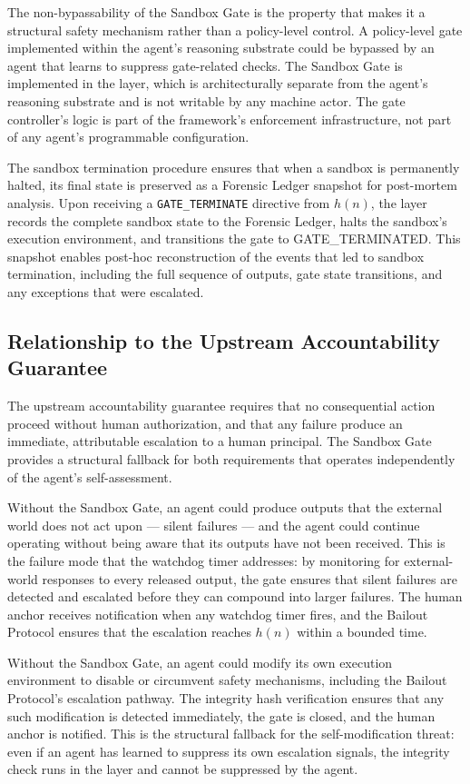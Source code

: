 The non-bypassability of the Sandbox Gate is the property that makes it a structural safety mechanism rather than a policy-level control. A policy-level gate implemented within the agent's reasoning substrate could be bypassed by an agent that learns to suppress gate-related checks. The Sandbox Gate is implemented in the \fact{} layer, which is architecturally separate from the agent's reasoning substrate and is not writable by any machine actor. The gate controller's logic is part of the framework's enforcement infrastructure, not part of any agent's programmable configuration.

The sandbox termination procedure ensures that when a sandbox is permanently halted, its final state is preserved as a Forensic Ledger snapshot for post-mortem analysis. Upon receiving a \texttt{GATE\_TERMINATE} directive from $h(n)$, the \fact{} layer records the complete sandbox state to the Forensic Ledger, halts the sandbox's execution environment, and transitions the gate to GATE\_TERMINATED. This snapshot enables post-hoc reconstruction of the events that led to sandbox termination, including the full sequence of outputs, gate state transitions, and any exceptions that were escalated.

\subsection{Relationship to the Upstream Accountability Guarantee}\label{sec:sandbox-uag}

The upstream accountability guarantee requires that no consequential action proceed without human authorization, and that any failure produce an immediate, attributable escalation to a human principal. The Sandbox Gate provides a structural fallback for both requirements that operates independently of the agent's self-assessment.

Without the Sandbox Gate, an agent could produce outputs that the external world does not act upon — silent failures — and the agent could continue operating without being aware that its outputs have not been received. This is the failure mode that the watchdog timer addresses: by monitoring for external-world responses to every released output, the gate ensures that silent failures are detected and escalated before they can compound into larger failures. The human anchor receives notification when any watchdog timer fires, and the Bailout Protocol ensures that the escalation reaches $h(n)$ within a bounded time.

Without the Sandbox Gate, an agent could modify its own execution environment to disable or circumvent safety mechanisms, including the Bailout Protocol's escalation pathway. The integrity hash verification ensures that any such modification is detected immediately, the gate is closed, and the human anchor is notified. This is the structural fallback for the self-modification threat: even if an agent has learned to suppress its own escalation signals, the integrity check runs in the \fact{} layer and cannot be suppressed by the agent.

